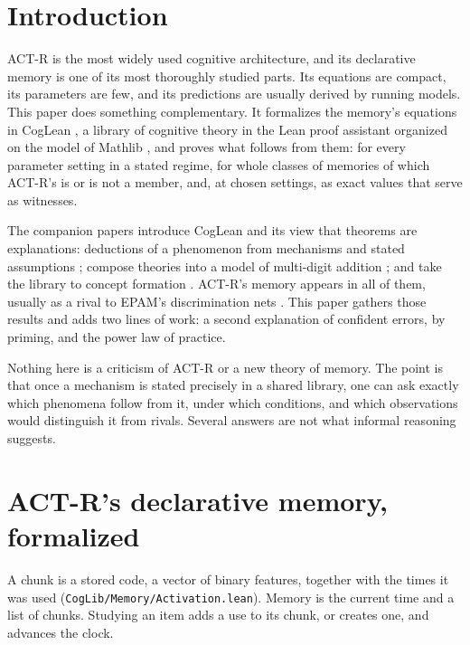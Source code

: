 \documentclass[11pt]{article}
\newcommand{\code}[1]{\texttt{#1}}
\begin{document}
\section{Introduction}

ACT-R \citep{anderson1998,anderson2007} is the most widely used cognitive architecture, and its declarative memory is one of its most thoroughly studied parts. Its equations are compact, its parameters are few, and its predictions are usually derived by running models. This paper does something complementary. It formalizes the memory's equations in CogLean \citep{coglean,shrager2026coglean}, a library of cognitive theory in the Lean proof assistant \citep{demoura2021} organized on the model of Mathlib \citep{mathlib2020}, and proves what follows from them: for every parameter setting in a stated regime, for whole classes of memories of which ACT-R's is or is not a member, and, at chosen settings, as exact values that serve as witnesses.

The companion papers introduce CogLean and its view that theorems are explanations: deductions of a phenomenon from mechanisms and stated assumptions \citep{shrager2026coglean}; compose theories into a model of multi-digit addition \citep{shrager2026multidigit}; and take the library to concept formation \citep{shrager2026view}. ACT-R's memory appears in all of them, usually as a rival to EPAM's discrimination nets \citep{feigenbaum1962}. This paper gathers those results and adds two lines of work: a second explanation of confident errors, by priming, and the power law of practice.

Nothing here is a criticism of ACT-R or a new theory of memory. The point is that once a mechanism is stated precisely in a shared library, one can ask exactly which phenomena follow from it, under which conditions, and which observations would distinguish it from rivals. Several answers are not what informal reasoning suggests.

\section{ACT-R's declarative memory, formalized}
\label{sec:formal}

A chunk is a stored code, a vector of binary features, together with the times it was used (\code{CogLib/Memory/Activation.lean}). Memory is the current time and a list of chunks. Studying an item adds a use to its chunk, or creates one, and advances the clock.
\end{document}
